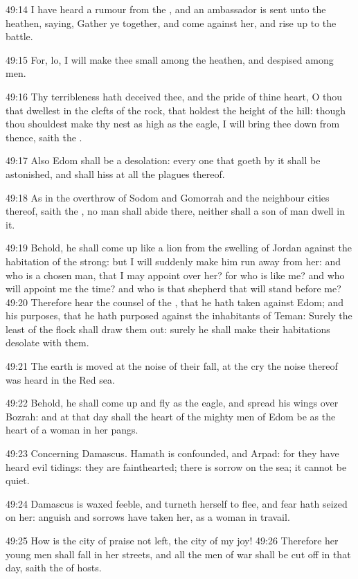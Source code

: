 49:14 I have heard a rumour from the \LORD, and an ambassador is sent unto the heathen, saying, Gather ye together, and come against her, and rise up to the battle.

49:15 For, lo, I will make thee small among the heathen, and despised among men.

49:16 Thy terribleness hath deceived thee, and the pride of thine heart, O thou that dwellest in the clefts of the rock, that holdest the height of the hill: though thou shouldest make thy nest as high as the eagle, I will bring thee down from thence, saith the \LORD.

49:17 Also Edom shall be a desolation: every one that goeth by it shall be astonished, and shall hiss at all the plagues thereof.

49:18 As in the overthrow of Sodom and Gomorrah and the neighbour cities thereof, saith the \LORD, no man shall abide there, neither shall a son of man dwell in it.

49:19 Behold, he shall come up like a lion from the swelling of Jordan against the habitation of the strong: but I will suddenly make him run away from her: and who is a chosen man, that I may appoint over her?  for who is like me? and who will appoint me the time? and who is that shepherd that will stand before me?  49:20 Therefore hear the counsel of the \LORD, that he hath taken against Edom; and his purposes, that he hath purposed against the inhabitants of Teman: Surely the least of the flock shall draw them out: surely he shall make their habitations desolate with them.

49:21 The earth is moved at the noise of their fall, at the cry the noise thereof was heard in the Red sea.

49:22 Behold, he shall come up and fly as the eagle, and spread his wings over Bozrah: and at that day shall the heart of the mighty men of Edom be as the heart of a woman in her pangs.

49:23 Concerning Damascus. Hamath is confounded, and Arpad: for they have heard evil tidings: they are fainthearted; there is sorrow on the sea; it cannot be quiet.

49:24 Damascus is waxed feeble, and turneth herself to flee, and fear hath seized on her: anguish and sorrows have taken her, as a woman in travail.

49:25 How is the city of praise not left, the city of my joy!  49:26 Therefore her young men shall fall in her streets, and all the men of war shall be cut off in that day, saith the \LORD of hosts.

